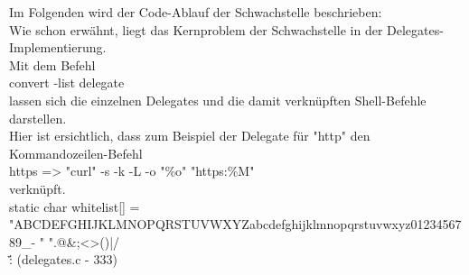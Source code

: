 Im Folgenden wird der Code-Ablauf der Schwachstelle beschrieben: \\

Wie schon erwähnt, liegt das Kernproblem der Schwachstelle in der Delegates-Implementierung.\\
Mit dem Befehl \\

convert -list delegate\\

lassen sich die einzelnen Delegates und die damit verknüpften Shell-Befehle darstellen.\\

Hier ist ersichtlich, dass zum Beispiel der Delegate für "http" den Kommandozeilen-Befehl\\
https =>          "curl" -s -k -L -o "\%o" "https:\%M"\\
verknüpft.\\


static char
whitelist[] =
"ABCDEFGHIJKLMNOPQRSTUVWXYZabcdefghijklmnopqrstuvwxyz0123456789_- "
".@&;<>()|/\\\'\":%
(delegates.c - 333)



